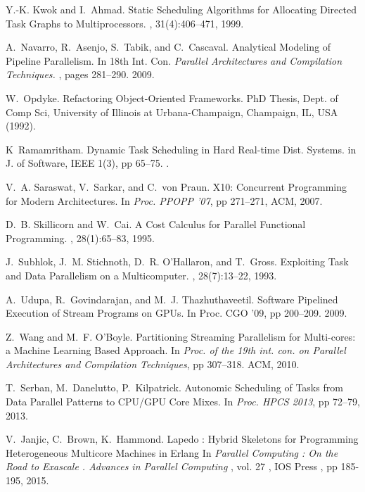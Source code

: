 \documentclass[smallextended]{svjour3}
\begin{document}
\begin{thebibliography}{}
Y.-K. Kwok and I.~Ahmad.
\newblock Static Scheduling Algorithms for Allocating Directed Task Graphs to
  Multiprocessors.
, 31(4):406--471, 1999.

A.~Navarro, R.~Asenjo, S.~Tabik, and C.~Cascaval.
\newblock Analytical Modeling of Pipeline Parallelism.
\newblock In {18th Int. Con. \em Parallel Architectures and Compilation Techniques.
}, pages 281--290. 2009.

W.~Opdyke.
\newblock Refactoring Object-Oriented Frameworks.
\newblock PhD Thesis, Dept. of Comp Sci, University of Illinois at Urbana-Champaign, Champaign, IL, USA (1992).

K~Ramamritham.
\newblock Dynamic Task Scheduling in Hard Real-time Dist. Systems.
\newblock in {J. of Software, IEEE 1(3), pp 65--75}.
.

V.~A. Saraswat, V.~Sarkar, and C.~von Praun.
\newblock X10: Concurrent Programming for Modern Architectures.
\newblock In {\em Proc. PPOPP '07}, pp 271--271, ACM, 2007.


D.~B. Skillicorn and W.~Cai.
\newblock A {C}ost {C}alculus for {P}arallel {F}unctional {P}rogramming.
, 28(1):65--83, 1995.

J.~Subhlok, J.~M. Stichnoth, D.~R. O'Hallaron, and T.~Gross.
\newblock Exploiting Task and Data Parallelism on a Multicomputer.
, 28(7):13--22, 1993.

A.~Udupa, R.~Govindarajan, and M.~J. Thazhuthaveetil.
\newblock Software Pipelined Execution of Stream Programs on GPUs.
\newblock In {Proc. CGO '09}, pp 200--209. 2009.

Z.~Wang and M.~F. O'Boyle.
\newblock Partitioning Streaming Parallelism for Multi-cores: a Machine
  Learning Based Approach.
\newblock In {\em Proc. of the 19th int. con. on Parallel
  Architectures and Compilation Techniques}, pp 307--318. ACM, 2010.
  
  T.~Serban, M.~Danelutto, P.~Kilpatrick.
  \newblock Autonomic Scheduling of Tasks from Data Parallel Patterns to CPU/GPU Core Mixes.
  \newblock In {\em Proc. HPCS 2013}, pp 72--79, 2013.

 V.~Janjic, C.~Brown, K.~Hammond. 
 \newblock Lapedo : Hybrid Skeletons for Programming Heterogeneous Multicore Machines in Erlang 
 \newblock In {\em Parallel Computing : On the Road to Exascale . Advances in Parallel Computing} , vol. 27 , IOS Press , pp 185-195, 2015.
 
\end{thebibliography}
\end{document}
